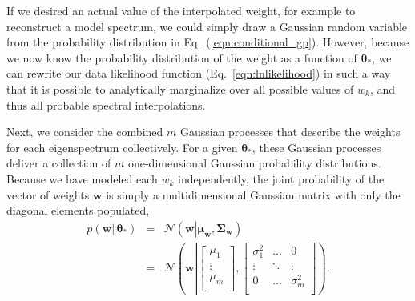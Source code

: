\documentclass[iop,floatfix,numberedappendix,twocolappendix]{emulateapj}
\newcommand{\vt}{ {\bm \theta}}
\begin{document}
If we desired an actual value of the interpolated weight, for example to reconstruct a model spectrum, we could simply draw a Gaussian random variable from the probability distribution in 
Eq.~(\ref{eqn:conditional_gp}).  However, because we now know the probability distribution of the 
weight as a function of $\vt_\ast$, we can rewrite our data likelihood function 
(Eq.~\ref{eqn:lnlikelihood}) in such a way that it is possible to analytically marginalize over all 
possible values of $w_k$, and thus all probable spectral interpolations. 

Next, we consider the combined $m$ Gaussian processes that describe the weights for each 
eigenspectrum collectively.  For a given $\vt_\ast$, these Gaussian processes deliver a collection 
of $m$ one-dimensional Gaussian probability distributions.  Because we have modeled each $w_k$ 
independently, the joint probability of the vector of weights $\mathbf{w}$ is simply a 
multidimensional Gaussian matrix with only the diagonal elements populated,
\begin{eqnarray} \label{eqn:weight_conditional}
  p(\mathbf{w} |\, \vt_\ast) &=& \mathcal{N} \left ( \mathbf{w} \left | \right . \mathbf{\mu}_\mathbf{w}, \mathbf{\Sigma}_\mathbf{w} \right ) \\ \nonumber
  & = & \mathcal{N} \left ( \mathbf{w} \left | 
  \begin{bmatrix}
    \mu_1 \\
    \vdots \\
    \mu_m \\
  \end{bmatrix},
  \begin{bmatrix}
    \sigma_1^2 & \ldots & 0 \\
    \vdots & \ddots & \vdots \\
    0 & \ldots & \sigma_m^2 \\
  \end{bmatrix}
  \right .
  \right).
\end{eqnarray}
\end{document}
